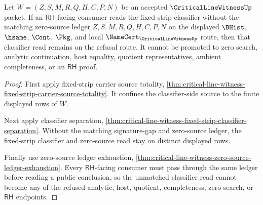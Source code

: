 \begin{theorem}
\label{thm:critical-line-witness-fixed-strip-zero-source-refusal}
Let $W=(Z,S,M,R,Q,H,C,P,N)$ be an accepted $\CriticalLineWitnessUp$ packet. If an $\mathsf{RH}$-facing consumer reads the fixed-strip classifier without the matching zero-source ledger $Z,S,M,R,Q,H,C,P,N$ on the displayed $\BHist$, $\hsame$, $\Cont$, $\Pkg$, and local $\NameCert_{\CriticalLineWitnessUp}$ route, then that classifier read remains on the refusal route. It cannot be promoted to zero search, analytic continuation, host equality, quotient representatives, ambient completeness, or an $\mathsf{RH}$ proof.
\end{theorem}
\begin{proof}
First apply fixed-strip carrier source totality, \autoref{thm:critical-line-witness-fixed-strip-carrier-source-totality}. It confines the classifier-side source to the finite displayed rows of $W$.

Next apply classifier separation, \autoref{thm:critical-line-witness-fixed-strip-classifier-separation}. Without the matching signature-gap and zero-source ledger, the fixed-strip classifier and zero-source read stay on distinct displayed rows.

Finally use zero-source ledger exhaustion, \autoref{thm:critical-line-witness-zero-source-ledger-exhaustion}. Every $\mathsf{RH}$-facing consumer must pass through the same ledger before reading a public conclusion, so the unmatched classifier read cannot become any of the refused analytic, host, quotient, completeness, zero-search, or $\mathsf{RH}$ endpoints.
\end{proof}
